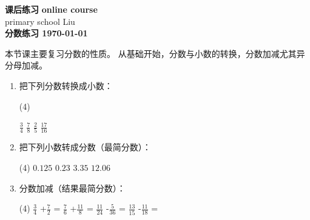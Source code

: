 \documentclass[DIN, pagenumber=false, fontsize=11pt, parskip=half]{scrartcl}
\newcommand{\mytitle}[1]{{\noindent\Large\textbf{#1}}}
\begin{document}
\noindent\textbf{课后练习} \hfill \textbf{online course}\\
primary school \hfill Liu\\

\mytitle{分数练习 \hfill \today}
\newline
\begin{parchmentquote}
    本节课主要复习分数的性质。
    从基础开始，分数与小数的转换，分数加减尤其异分母加减。


\end{parchmentquote}

\begin{enumerate}
    \item 把下列分数转换成小数：
          \begin{tasks}(4)

              \task $\frac{3}{4}$
              \task $\frac{7}{8}$
              \task $\frac{2}{5}$
              \task $\frac{17}{16}$

          \end{tasks}

    \item 把下列小数转成分数（最简分数）：
          \begin{tasks}(4)
              \task $0.125$
              \task $ 0.23$
              \task $3.35$
              \task $12.06$
          \end{tasks}
  \item 分数加减（结果最简分数）：
          \begin{tasks}(4)
               \task $\frac{3}{4}$ +$\frac{7}{2}$ =
              \task $\frac{7}{6}$ +$\frac{11}{8}$ =
              \task $\frac{11}{24}$ -$\frac{5}{36}$ =
              \task $\frac{13}{15}$ -$\frac{11}{18}$ =
            
              
          \end{tasks}
\end{enumerate}
\end{document}
